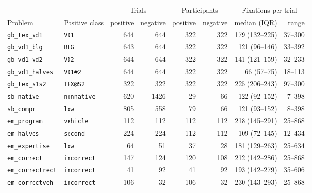 \begin{tabular}{llrrrrrr}
\toprule
 & & \multicolumn{2}{c}{Trials} & \multicolumn{2}{c}{Participants} & \multicolumn{2}{c}{Fixations per trial} \\
\cmidrule(lr){3-4}\cmidrule(lr){5-6}\cmidrule(lr){7-8}
Problem & Positive class & positive & negative & positive & negative & median (IQR) & range \\
\midrule
\texttt{gb\_tex\_vd1} & \texttt{VD1} & 644 & 644 & 322 & 322 & 179 (132--225) & 37--300 \\
\texttt{gb\_vd1\_blg} & \texttt{BLG} & 643 & 644 & 322 & 322 & 121 (96--146) & 33--392 \\
\texttt{gb\_vd1\_vd2} & \texttt{VD2} & 644 & 644 & 322 & 322 & 141 (121--159) & 32--233 \\
\texttt{gb\_vd1\_halves} & \texttt{VD1\#2} & 644 & 644 & 322 & 322 & 66 (57--75) & 18--113 \\
\texttt{gb\_tex\_s1s2} & \texttt{TEX@S2} & 322 & 322 & 322 & 322 & 225 (206--243) & 97--300 \\
\texttt{sb\_native} & \texttt{nonnative} & 620 & 1426 & 29 & 66 & 122 (92--152) & 7--398 \\
\texttt{sb\_compr} & \texttt{low} & 805 & 558 & 79 & 66 & 121 (93--152) & 8--398 \\
\texttt{em\_program} & \texttt{vehicle} & 112 & 112 & 112 & 112 & 218 (145--291) & 25--868 \\
\texttt{em\_halves} & \texttt{second} & 224 & 224 & 112 & 112 & 109 (72--145) & 12--434 \\
\texttt{em\_expertise} & \texttt{low} & 64 & 51 & 37 & 28 & 181 (129--263) & 25--634 \\
\texttt{em\_correct} & \texttt{incorrect} & 147 & 124 & 120 & 108 & 212 (142--286) & 25--868 \\
\texttt{em\_correctrect} & \texttt{incorrect} & 41 & 92 & 41 & 92 & 193 (142--279) & 35--606 \\
\texttt{em\_correctveh} & \texttt{incorrect} & 106 & 32 & 106 & 32 & 230 (143--293) & 25--868 \\
\bottomrule
\end{tabular}
